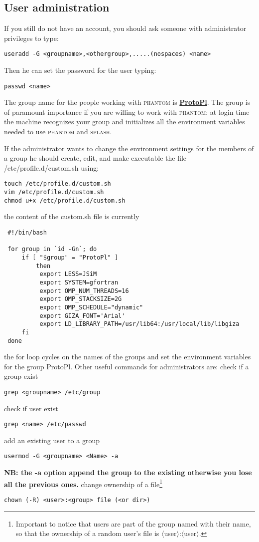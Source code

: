 \documentclass[10pt,a4paper,twoside]{article} %
\begin{document}
\subsection{User administration}
If you still do not have an account, you should ask someone with administrator privileges to type:
\begin{verbatim}
useradd -G <groupname>,<othergroup>,.....(nospaces) <name>
\end{verbatim}
Then he can set the password for the user typing:
\begin{verbatim}
passwd <name>
\end{verbatim}
The group name for the people working with \textsc{phantom} is \underline{\textbf{ProtoPl}}. The group is of paramount importance if you are willing to work with \textsc{phantom}: at login time the machine recognizes your group and initializes all the environment variables needed to use \textsc{phantom} and \textsc{splash}.

If the administrator wants to change the environment settings for the members of a group he should create, edit, and make executable the file /etc/profile.d/custom.sh using:
\begin{verbatim}
touch /etc/profile.d/custom.sh
vim /etc/profile.d/custom.sh
chmod u+x /etc/profile.d/custom.sh
\end{verbatim}
the content of the custom.sh file is currently
\begin{verbatim}
 #!/bin/bash 
 
 for group in `id -Gn`; do
     if [ "$group" = "ProtoPl" ] 
         then
          export LESS=JSiM
          export SYSTEM=gfortran
          export OMP_NUM_THREADS=16
          export OMP_STACKSIZE=2G
          export OMP_SCHEDULE="dynamic"
          export GIZA_FONT='Arial'
          export LD_LIBRARY_PATH=/usr/lib64:/usr/local/lib/libgiza
     fi
 done
\end{verbatim}
the for loop cycles on the names of the groups and set the environment variables for the group ProtoPl.
Other useful commands for administrators are: check if a group exist
\begin{verbatim}
grep <groupname> /etc/group
\end{verbatim}
check if user exist
\begin{verbatim}
grep <name> /etc/passwd
\end{verbatim}
add an existing user to a group
\begin{verbatim}
usermod -G <groupname> <Name> -a 
\end{verbatim}
\textbf{NB: the -a option append the group to the existing otherwise you lose all the previous ones.}
change ownership of a file\footnote{Important to notice that users are part of the group named with their name, so that the ownership of a random user's file is $\langle$user$\rangle$:$\langle$user$\rangle$.}
\begin{verbatim}
chown (-R) <user>:<group> file (<or dir>)
\end{verbatim}
\end{document}
